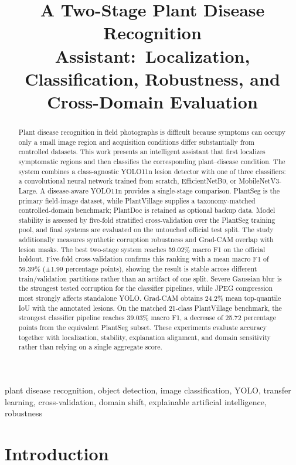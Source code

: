 \documentclass[conference]{IEEEtran}
\title{A Two-Stage Plant Disease Recognition Assistant:\
Localization, Classification, Robustness, and Cross-Domain Evaluation}
\author{
\IEEEauthorblockN{Federico Volpi}
\IEEEauthorblockA{
M.Sc. in Computer Engineering\\
University of Pisa, Pisa, Italy
}
\and
\IEEEauthorblockN{Rafay Zia}
\IEEEauthorblockA{
M.Sc. in Computer Engineering\\
University of Pisa, Pisa, Italy
}}
\newcommand{\ppoints}{percentage points}
\begin{document}
\maketitle

\begin{abstract}
Plant disease recognition in field photographs is difficult because symptoms can occupy only a
small image region and acquisition conditions differ substantially from controlled datasets. This
work presents an intelligent assistant that first localizes symptomatic regions and then classifies
the corresponding plant--disease condition. The system combines a class-agnostic YOLO11n lesion
detector with one of three classifiers: a convolutional neural network trained from scratch,
EfficientNetB0, or MobileNetV3-Large. A disease-aware YOLO11n provides a single-stage comparison.
PlantSeg is the primary field-image dataset, while PlantVillage supplies a taxonomy-matched
controlled-domain benchmark; PlantDoc is retained as optional backup data. Model stability is
assessed by five-fold stratified cross-validation over the PlantSeg training pool, and final systems
are evaluated on the untouched official test split. The study additionally measures synthetic
corruption robustness and Grad-CAM overlap with lesion masks. The best two-stage system reaches
59.02\% macro F1 on the official holdout. Five-fold cross-validation confirms this ranking with a
mean macro F1 of 59.39\% ($\pm$1.99 \ppoints), showing the result is stable across different
train/validation partitions rather than an artifact of one split. Severe Gaussian blur is the
strongest tested corruption for the classifier pipelines, while JPEG compression most strongly
affects standalone YOLO. Grad-CAM obtains 24.2\% mean top-quantile IoU with the annotated lesions.
On the matched 21-class PlantVillage benchmark, the strongest classifier pipeline reaches
39.03\% macro F1, a decrease of 25.72 \ppoints{} from the equivalent PlantSeg subset. These
experiments evaluate accuracy together with localization, stability,
explanation alignment, and domain sensitivity rather than relying on a single aggregate score.
\end{abstract}

\begin{IEEEkeywords}
plant disease recognition, object detection, image classification, YOLO, transfer learning,
cross-validation, domain shift, explainable artificial intelligence, robustness
\end{IEEEkeywords}

\section{Introduction}
\end{document}
